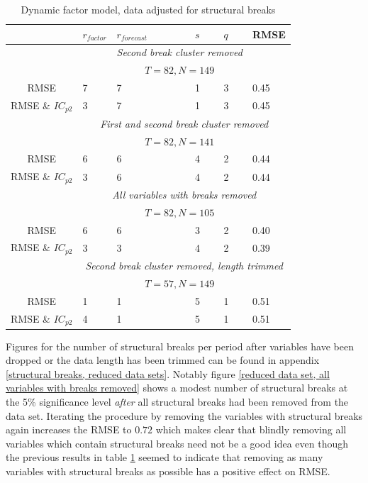\documentclass[12pt]{article}
\begin{document}
\begin{table}[ht]
	\centering
	\begin{tabular}{c|lllll}
		   & $r_{factor}$ & $r_{forecast}$ & $s$ & $q$ & RMSE \\
		 \hline
		 \hline
		    & & \multicolumn{3}{c}{\textit{Second break cluster removed}} \\
			& & \multicolumn{3}{c}{$T=82, N=149$} \\
		  \hline
		   	RMSE & 7 & 7 & 1 & 3 & 0.45 \\
		   	RMSE \& $IC_{p2}$ & 3 & 7 & 1 & 3 & 0.45 \\
		  \hline
		  \hline
		  & \multicolumn{5}{c}{\textit{First and second break cluster removed}} \\ 
			& & \multicolumn{3}{c}{$T=82, N=141$} \\
		  \hline
		   	RMSE & 6 & 6 & 4 & 2 & 0.44 \\
		   	RMSE \& $IC_{p2}$ & 3 & 6 & 4 & 2 & 0.44 \\
		  \hline
		  \hline
	  	  & \multicolumn{5}{c}{\textit{All variables with breaks removed}} \\ 
			& & \multicolumn{3}{c}{$T=82, N=105$} \\
          \hline
		   	RMSE & 6 & 6 & 3 & 2 & 0.40 \\
		   	RMSE \& $IC_{p2}$ & 3 & 3 & 4 & 2 & 0.39 \\
		  \hline
		  \hline
		  & \multicolumn{5}{c}{\textit{Second break cluster removed, length trimmed}} \\
			& & \multicolumn{3}{c}{$T=57, N=149$} \\
		  \hline
		   	RMSE & 1 & 1 & 5 & 1 & 0.51 \\
		   	RMSE \& $IC_{p2}$ & 4 & 1 & 5 & 1 & 0.51 \\
		  \hline
		  \hline		  
	\end{tabular}
	\caption{Dynamic factor model, data adjusted for structural breaks}
	\label{results dynamic factor model, reduced data sets}
\end{table}


Figures for the number of structural breaks per period after variables have been dropped or the data length has been trimmed can be found in appendix \ref{structural breaks, reduced data sets}. Notably figure \ref{reduced data set, all variables with breaks removed} shows a modest number of structural breaks at the 5\% significance level \textit{after} all structural breaks had been removed from the data set. Iterating the procedure by removing the variables with structural breaks again increases the RMSE to $0.72$ which makes clear that blindly removing all variables which contain structural breaks need not be a good idea even though the previous results in table \ref{results dynamic factor model, reduced data sets} seemed to indicate that removing as many variables with structural breaks as possible has a positive effect on RMSE.
\end{document}
